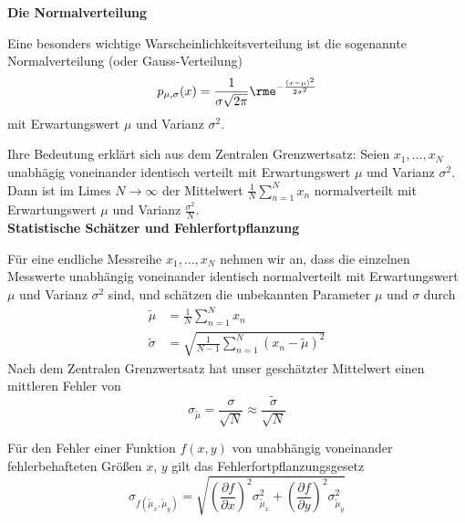 \documentclass[a4paper,10pt]{article}
\begin{document}
{\bf Die Normalverteilung}

Eine besonders wichtige Warscheinlichkeitsverteilung ist die sogenannte
Normalverteilung (oder Gauss-Verteilung)
\[
p_{\mu,\sigma}(x) = \frac{1}{\sigma\sqrt{2\pi}}\rme^{-\frac{(x-\mu)^2}{2\sigma^2}}
\]
mit Erwartungswert $\mu$ und Varianz $\sigma^2$.

Ihre Bedeutung erklärt sich aus dem Zentralen Grenzwertsatz:
Seien $x_1,\ldots,x_N$ unabhägig voneinander identisch verteilt mit
Erwartungswert $\mu$ und Varianz $\sigma^2$. Dann ist im Limes $N\to\infty$
der Mittelwert $\frac{1}{N}\sum_{n=1}^N x_n$ normalverteilt mit
Erwartungswert $\mu$ und Varianz $\frac{\sigma^2}{N}$.\\


{\bf Statistische Schätzer und Fehlerfortpflanzung}

Für eine endliche Messreihe $x_1,\ldots,x_N$ nehmen wir an, dass die
einzelnen Messwerte unabhängig voneinander identisch normalverteilt
mit Erwartungswert $\mu$ und Varianz $\sigma^2$ sind, und schätzen
die unbekannten Parameter $\mu$ und $\sigma$ durch
\begin{align*}
\tilde{\mu} &= \frac{1}{N}\sum_{n=1}^N x_n \\
\tilde{\sigma} &= \sqrt{\frac{1}{N-1}\sum_{n=1}^N (x_n-\tilde{\mu})^2}
\end{align*}
Nach dem Zentralen Grenzwertsatz hat unser geschätzter Mittelwert einen
mittleren Fehler von
\[
\sigma_{\tilde{\mu}}=\frac{\sigma}{\sqrt{N}}\approx \frac{\tilde{\sigma}}{\sqrt{N}}
\]

Für den Fehler einer Funktion $f(x,y)$ von unabhängig
voneinander fehlerbehafteten Größen $x$, $y$ gilt das
Fehlerfortpflanzungsgesetz
\[
\sigma_{f(\tilde{\mu}_x,\tilde{\mu}_y)} = 
   \sqrt{\left(\frac{\partial f}{\partial x}\right)^2\sigma_{\tilde{\mu}_x}^2
        +\left(\frac{\partial f}{\partial y}\right)^2\sigma_{\tilde{\mu}_y}^2}
\]
\end{document}
